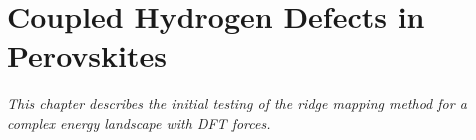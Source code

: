 \chapter{Coupled Hydrogen Defects in Perovskites}
\label{chap:perovskites}

\textit{This chapter describes the initial testing of the ridge mapping method for a complex energy landscape with DFT forces.}





